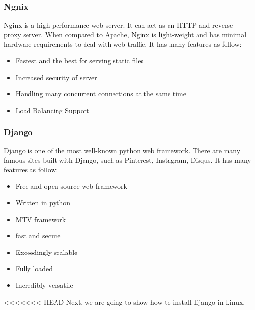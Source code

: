 \subsubsection{Ngnix}
Nginx is a high performance web server. It can act as an HTTP and reverse proxy server. When compared to Apache, Nginx is light-weight and has minimal hardware requirements to deal with web traffic. It has many features as follow:
\begin{itemize}
	\item Fastest and the best for serving static files
	\item Increased security of server 
	\item Handling many concurrent connections at the same time
	\item Load Balancing Support
\end{itemize}
\subsubsection{Django}
Django is one of the most well-known python web framework. There are many famous sites built with Django, such as Pinterest, Instagram, Disqus. It has many features as follow:
\begin{itemize}
	\item Free and open-source web framework
	\item Written in python
	\item MTV framework
	\item fast and secure
	\item Exceedingly scalable
	\item Fully loaded
	\item Incredibly versatile
\end{itemize}
<<<<<<< HEAD
Next, we are going to show how to install Django in Linux.
